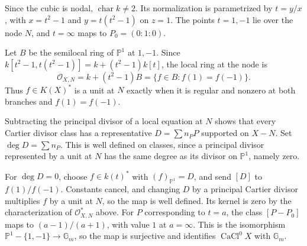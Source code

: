 Since the cubic is nodal, $\operatorname{char}k\neq2$. Its normalization is parametrized by $t=y/x$, with $x=t^2-1$ and $y=t(t^2-1)$ on $z=1$. The points $t=1,-1$ lie over the node $N$, and $t=\infty$ maps to $P_0=(0:1:0)$.

Let $B$ be the semilocal ring of $\mathbb P^1$ at $1,-1$. Since $k[t^2-1,t(t^2-1)]=k+(t^2-1)k[t]$, the local ring at the node is
\[\mathcal O_{X,N}=k+(t^2-1)B=\{f\in B:f(1)=f(-1)\}.\]
Thus $f\in K(X)^*$ is a unit at $N$ exactly when it is regular and nonzero at both branches and $f(1)=f(-1)$.

Subtracting the principal divisor of a local equation at $N$ shows that every Cartier divisor class has a representative $D=\sum n_PP$ supported on $X-N$. Set $\deg D=\sum n_P$. This is well defined on classes, since a principal divisor represented by a unit at $N$ has the same degree as its divisor on $\mathbb P^1$, namely zero.

For $\deg D=0$, choose $f\in k(t)^*$ with $(f)_{\mathbb P^1}=D$, and send $[D]$ to $f(1)/f(-1)$. Constants cancel, and changing $D$ by a principal Cartier divisor multiplies $f$ by a unit at $N$, so the map is well defined. Its kernel is zero by the characterization of $\mathcal O_{X,N}^*$ above. For $P$ corresponding to $t=a$, the class $[P-P_0]$ maps to $(a-1)/(a+1)$, with value $1$ at $a=\infty$. This is the isomorphism $\mathbb P^1-\{1,-1\}\to\mathbb G_m$, so the map is surjective and identifies $\operatorname{CaCl}^0X$ with $\mathbb G_m$.
